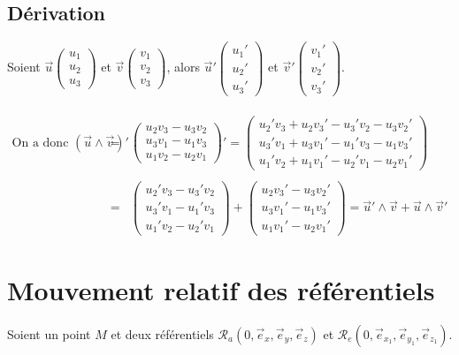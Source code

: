 \documentclass[a4paper,10pt]{book} %
\begin{document}
\subsection*{Dérivation}
Soient $\vec{u}\begin{pmatrix}
u_1 \\ u_2 \\ u_3
\end{pmatrix}$ et $\vec{v}\begin{pmatrix}
v_1 \\ v_2 \\ v_3
\end{pmatrix}$, alors $\vec{u}'\begin{pmatrix}
u_1' \\ u_2' \\ u_3'
\end{pmatrix}$ et $\vec{v}'\begin{pmatrix}
v_1' \\ v_2' \\ v_3'
\end{pmatrix}$.\\\\

$\begin{array}{rcl}
\text{On a donc }(\vec{u}\wedge\vec{v})'&=&\begin{pmatrix}
u_2v_3-u_3v_2 \\
u_3v_1-u_1v_3 \\
u_1v_2-u_2v_1
\end{pmatrix}'=\begin{pmatrix}
u_2'v_3+u_2v_3'-u_3'v_2-u_3v_2' \\
u_3'v_1+u_3v_1'-u_1'v_3-u_1v_3' \\
u_1'v_2+u_1v_1'-u_2'v_1-u_2v_1'
\end{pmatrix}\\\\
&=&\begin{pmatrix}
u_2'v_3-u_3'v_2 \\
u_3'v_1-u_1'v_3 \\
u_1'v_2-u_2'v_1
\end{pmatrix}+\begin{pmatrix}
u_2v_3'-u_3v_2'\\
u_3v_1'-u_1v_3'\\
u_1v_1'-u_2v_1'
\end{pmatrix}=\vec{u}'\wedge\vec{v}+\vec{u}\wedge\vec{v}'
\end{array}$

\section{Mouvement relatif des référentiels}
Soient un point $M$ et deux référentiels $\mathcal{R}_a(0,\overrightarrow{e}_x,\overrightarrow{e}_y,\overrightarrow{e}_z)$ et $\mathcal{R}_e(0,\overrightarrow{e}_{x_1},\overrightarrow{e}_{y_1},\overrightarrow{e}_{z_1})$.\\
\end{document}
